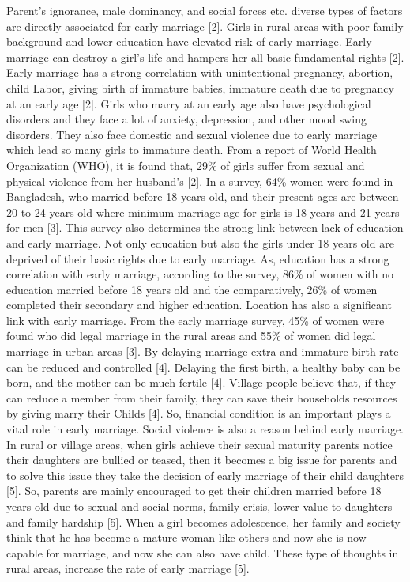 \documentclass{article}
\begin{document}
    Parent’s ignorance, male dominancy, and social forces etc. diverse types of factors are directly associated for early marriage [2]. Girls in rural areas with poor family background and lower education have elevated risk of early marriage. Early marriage can destroy a girl’s life and hampers her all-basic fundamental rights [2]. Early marriage has a strong correlation with unintentional pregnancy, abortion, child Labor, giving birth of immature babies, immature death due to pregnancy at an early age [2]. Girls who marry at an early age also have psychological disorders and they face a lot of anxiety, depression, and other mood swing disorders. They also face domestic and sexual violence due to early marriage which lead so many girls to immature death. From a report of World Health Organization (WHO), it is found that, 29\% of girls suffer from sexual and physical violence from her husband's [2]. In a survey, 64\% women were found in Bangladesh, who married before 18 years old, and their present ages are between 20 to 24 years old where minimum marriage age for girls is 18 years and 21 years for men [3]. This survey also determines the strong link between lack of education and early marriage. Not only education but also the girls under 18 years old are deprived of their basic rights due to early marriage. As, education has a strong correlation with early marriage, according to the survey, 86\% of women with no education married before 18 years old and the comparatively, 26\% of women completed their secondary and higher education. Location has also a significant link with early marriage. From the early marriage survey, 45\% of women were found who did legal marriage in the rural areas and 55\% of women did legal marriage in urban areas [3]. By delaying marriage extra and immature birth rate can be reduced and controlled [4]. Delaying the first birth, a healthy baby can be born, and the mother can be much fertile [4]. Village people believe that, if they can reduce a member from their family, they can save their households resources by giving marry their Childs [4]. So, financial condition is an important plays a vital role in early marriage. Social violence is also a reason behind early marriage. In rural or village areas, when girls achieve their sexual maturity parents notice their daughters are bullied or teased, then it becomes a big issue for parents and to solve this issue they take the decision of early marriage of their child daughters [5]. So, parents are mainly encouraged to get their children married before 18 years old due to sexual and social norms, family crisis, lower value to daughters and family hardship [5]. When a girl becomes adolescence, her family and society think that he has become a mature woman like others and now she is now capable for marriage, and now she can also have child. These type of thoughts in rural areas, increase the rate of early marriage [5]. 
\end{document}
